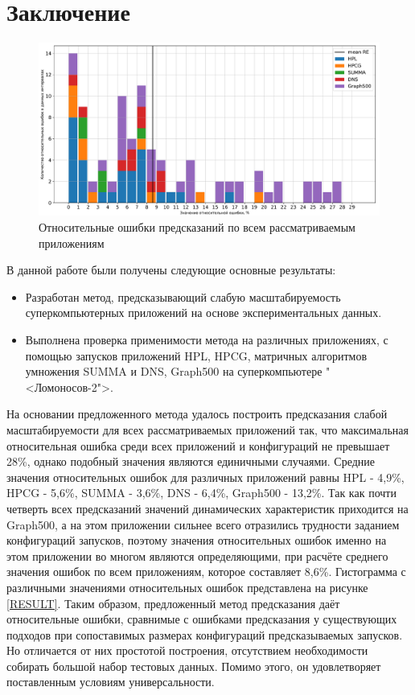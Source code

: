 \section{Заключение}
	\begin{figure}
		\centering
		\includegraphics[width=\textwidth]{./images/RE_graph}
		\caption{Относительные ошибки предсказаний по всем рассматриваемым приложениям}
		\label{RESULT}
	\end{figure}
	В данной работе были получены следующие основные результаты:
	\begin{itemize}
		\item Разработан метод, предсказывающий слабую масштабируемость суперкомпьютерных приложений на основе экспериментальных данных.
		\item Выполнена проверка применимости метода на различных приложениях, с помощью запусков приложений HPL, HPCG, матричных алгоритмов умножения SUMMA и DNS, Graph500 на суперкомпьютере "<Ломоносов-2">.
	\end{itemize}

	На основании предложенного метода удалось построить предсказания слабой масштабируемости для всех рассматриваемых приложений так, что максимальная относительная ошибка среди всех приложений и конфигураций не превышает 28\%, однако подобный значения являются единичными случаями. Средние значения относительных ошибок для различных приложений равны HPL - 4,9\%, HPCG - 5,6\%, SUMMA - 3,6\%, DNS - 6,4\%, Graph500 - 13,2\%. Так как почти четверть всех предсказаний значений динамических характеристик приходится на Graph500, а на этом приложении сильнее всего отразились трудности заданием конфигураций запусков, поэтому значения относительных ошибок именно на этом приложении во многом являются определяющими, при расчёте среднего значения ошибок по всем приложениям, которое составляет 8,6\%. Гистограмма с различными значениями относительных ошибок представлена на рисунке \eqref{RESULT}. Таким образом, предложенный метод предсказания даёт относительные ошибки, сравнимые с ошибками предсказания у существующих подходов при сопоставимых размерах конфигураций предсказываемых запусков. Но отличается от них простотой построения, отсутствием необходимости собирать большой набор тестовых данных. Помимо этого, он удовлетворяет поставленным условиям универсальности.
	
\clearpage
